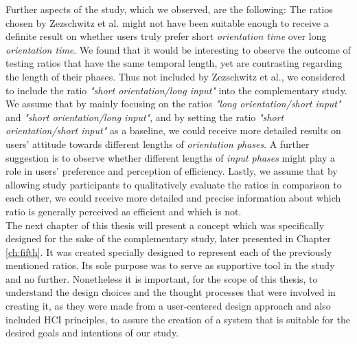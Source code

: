 Further aspects of the study, which we observed, are the following: The ratios chosen by Zezschwitz et al. \cite{Zezschwitz} might not have been suitable enough to receive a definite result on whether users truly prefer short \textit{orientation time} over long \textit{orientation time}. We found that it would be interesting to observe the outcome of testing ratios that have the same temporal length, yet are contrasting regarding the length of their phases. Thus not included by Zezschwitz et al., we considered to include the ratio \textit{"short orientation/long input"} into the complementary study. We assume that by mainly focusing on the ratios \textit{"long orientation/short input"} and \textit{"short orientation/long input"}, and by setting the ratio \textit{"short orientation/short input"} as a baseline, we could receive more detailed results on users' attitude towards different lengths of \textit{orientation phases}. A further suggestion is to observe whether different lengths of \textit{input phases} might play a role in users' preference and perception of efficiency. Lastly, we assume that by allowing study participants to qualitatively evaluate the ratios in comparison to each other, we could receive more detailed and precise information about which ratio is generally perceived as efficient and which is not. \\

The next chapter of this thesis will present a concept which was specifically designed for the sake of the complementary study, later presented in Chapter \ref{ch:fifth}. It was created specially designed to represent each of the previously mentioned ratios. Its sole purpose was to serve as supportive tool in the study and no further. Nonetheless it is important, for the scope of this thesis, to understand the design choices and the thought processes that were involved in creating it, as they were made from a user-centered design approach and also included HCI principles, to assure the creation of a system that is suitable for the desired goals and intentions of our study. 







